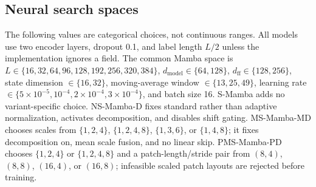 \subsection{Neural search spaces}

The following values are categorical choices, not continuous ranges.
All models use two encoder layers, dropout 0.1, and label length $L/2$ unless the implementation ignores a field.
The common Mamba space is $L\in\{16,32,64,96,128,192,256,320,384\}$, $d_{\mathrm{model}}\in\{64,128\}$, $d_{\mathrm{ff}}\in\{128,256\}$, state dimension $\in\{16,32\}$, moving-average window $\in\{13,25,49\}$, learning rate $\in\{5\times10^{-5},10^{-4},2\times10^{-4},3\times10^{-4}\}$, and batch size 16.
S-Mamba adds no variant-specific choice.
NS-Mamba-D fixes standard rather than adaptive normalization, activates decomposition, and disables shift gating.
MS-Mamba-MD chooses scales from $\{1,2,4\}$, $\{1,2,4,8\}$, $\{1,3,6\}$, or $\{1,4,8\}$; it fixes decomposition on, mean scale fusion, and no linear skip.
PMS-Mamba-PD chooses $\{1,2,4\}$ or $\{1,2,4,8\}$ and a patch-length/stride pair from $(8,4)$, $(8,8)$, $(16,4)$, or $(16,8)$; infeasible scaled patch layouts are rejected before training.

\begin{table}[t]
\centering
\caption{Non-Mamba categorical search spaces. ``LR'' denotes learning rate and ``BS'' batch size.}
\label{tab:baseline-search-spaces}
\end{table}

